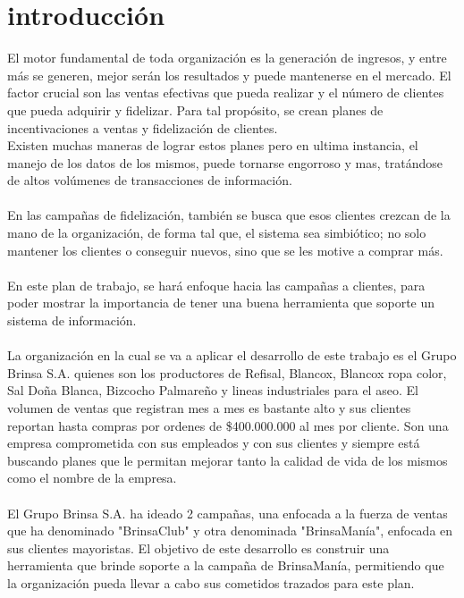 \chapter*{introducci\'on}
El motor fundamental de toda organizaci\'on es la generaci\'on de ingresos, y entre m\'as se 
generen, mejor ser\'an los resultados y puede mantenerse en el mercado. El factor crucial son las ventas efectivas que pueda realizar y el n\'umero de clientes que pueda adquirir y fidelizar. Para tal prop\'osito, se crean planes de incentivaciones a ventas y fidelizaci\'on de clientes.%
\\%
Existen muchas maneras de lograr estos planes pero en ultima instancia, el manejo de los datos de los mismos, puede tornarse engorroso y mas, trat\'andose de altos vol\'umenes de transacciones de informaci\'on.%
\\%
\\%
En las campa\~nas de fidelizaci\'on, tambi\'en se busca que esos clientes crezcan de la mano de la organizaci\'on, de forma tal que, el sistema sea simbi\'otico; no solo mantener los clientes o conseguir nuevos, sino que se les motive a comprar m\'as.%
\\%
\\%
En este plan de trabajo, se har\'a enfoque hacia las campa\~nas a clientes, para poder mostrar la importancia de tener una buena herramienta que soporte un sistema de informaci\'on.%
\\%
\\%
La organizaci\'on en la cual se va a aplicar el desarrollo de este trabajo es el Grupo Brinsa S.A. quienes son los productores de Refisal, Blancox, Blancox ropa color, Sal Do\~na Blanca, Bizcocho Palmare\~no y lineas industriales para el aseo. El volumen de ventas que registran mes a mes es bastante alto y sus clientes reportan hasta compras por ordenes de \$400.000.000 al mes por cliente. Son una empresa comprometida con sus empleados y con sus clientes y siempre est\'a buscando planes que le permitan mejorar tanto la calidad de vida de los mismos como el nombre de la empresa.%
\\%
\\%
El Grupo Brinsa S.A. ha ideado 2 campa\~nas, una enfocada a la fuerza de ventas que ha denominado "BrinsaClub" y otra denominada "BrinsaMan\'ia", enfocada en sus clientes mayoristas. El objetivo de este desarrollo es construir una herramienta que brinde soporte a la campa\~na de BrinsaMan\'ia, permitiendo que la organizaci\'on pueda llevar a cabo sus cometidos trazados para este plan.%